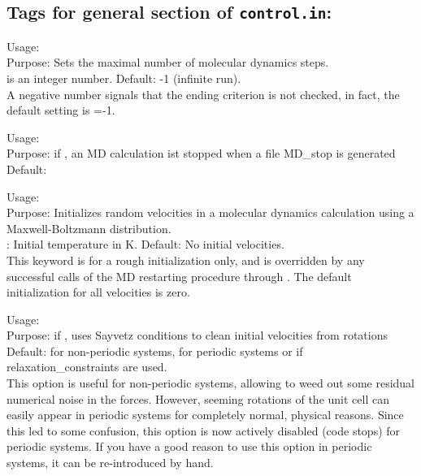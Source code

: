 \subsection*{Tags for general section of \texttt{control.in}:}

{\noindent
	Usage:   \\[1.0ex]
	Purpose: Sets the maximal number of molecular dynamics
          steps. \\[1.0ex]
         is an integer number. Default: -1 (infinite
          run). \\ 
}
A negative number signals that the ending criterion is not checked, in
fact, the default setting is =-1. 

{\noindent
      Usage:  \\[1.0ex]
      Purpose: if , an MD calculation ist stopped when a file MD\_stop is generated \\[1.0ex]
      Default:  \\}

{\noindent
	Usage:   \\[1.0ex]
	Purpose: Initializes random velocities in a molecular dynamics calculation 
          using a Maxwell-Boltzmann distribution. \\[1.0ex]
         : Initial temperature in K. Default: No
          initial velocities. \\
}
This keyword is for a rough initialization only, and is overridden by
any successful calls of the MD restarting procedure through
. The default initialization for all velocities
is zero. 

{\noindent
      Usage:  \\[1.0ex]
      Purpose: if , uses Sayvetz conditions to clean initial velocities from rotations\\[1.0ex]
      Default:  for non-periodic systems,  for
      periodic systems or if relaxation\_constraints are used.\\} 
This option is useful for non-periodic systems, allowing to weed out some
residual numerical noise in the forces. However, seeming rotations of the unit
cell can easily appear in periodic systems for completely normal, physical
reasons. Since this led to some confusion, this option is now actively
disabled (code stops) for periodic systems. If you have a good reason to use
this option in periodic systems, it can be re-introduced by hand.

